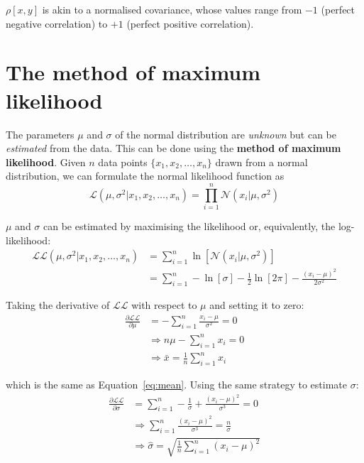 \begin{refsection}
\noindent $\rho[x,y]$ is akin to a normalised covariance, whose values
range from $-1$ (perfect negative correlation) to $+1$ (perfect
positive correlation).

\section{The method of maximum likelihood}
\label{sec:maximum-likelihood}

The parameters $\mu$ and $\sigma$ of the normal distribution are
\emph{unknown} but can be \emph{estimated} from the data. This can be
done using the \textbf{method of maximum likelihood}.  Given $n$ data
points $\{x_1, x_2, \ldots, x_n\}$ drawn from a normal distribution,
we can formulate the normal likelihood function as
\begin{equation}
  \mathcal{L}(\mu,\sigma^2|x_1,x_2,\ldots,x_n) =
  \prod\limits_{i=1}^{n}\mathcal{N}(x_i|\mu,\sigma^2)
  \label{eq:Lnorm}
\end{equation}

$\mu$ and $\sigma$ can be estimated by maximising the likelihood or,
equivalently, the log-likelihood:
\begin{equation}
  \begin{split}
    \mathcal{LL}(\mu,\sigma^2|x_1,x_2,\ldots,x_n) & =
    \sum\limits_{i=1}^{n}\ln\left[\mathcal{N}(x_i|\mu,\sigma^2)\right] \\ & =
    \sum\limits_{i=1}^{n} -\ln[\sigma] - \frac{1}{2}\ln[2\pi] -
    \frac{(x_i-\mu)^2}{2\sigma^2}
  \end{split}
  \label{eq:LLnorm}
\end{equation}

Taking the derivative of $\mathcal{LL}$ with respect to $\mu$ and
setting it to zero:
\begin{equation}
  \begin{split}
    \frac{\partial{\mathcal{LL}}}{\partial{\mu}} & =
    - \sum\limits_{i=1}^{n} \frac{x_i-\mu}{\sigma^2} = 0 \\
    & \Rightarrow n\mu - \sum\limits_{i=1}^{n} x_i = 0 \\
    & \Rightarrow \bar{x} = \frac{1}{n}\sum\limits_{i=1}^{n}x_i
  \end{split}
  \label{eq:arithmeticmean}
\end{equation}

\noindent which is the same as Equation~\ref{eq:mean}. Using the same
strategy to estimate $\sigma$:
\begin{equation}
  \begin{split}
    \frac{\partial{\mathcal{LL}}}{\partial{\sigma}} & =
    \sum\limits_{i=1}^{n} - \frac{1}{\sigma} +  \frac{(x_i-\mu)^2}{\sigma^3} = 0\\
    & \Rightarrow  \sum\limits_{i=1}^{n} \frac{(x_i-\mu)^2}{\sigma^3} =
    \frac{n}{\sigma} \\
    & \Rightarrow \hat{\sigma} = \sqrt{\frac{1}{n}\sum\limits_{i=1}^{n}(x_i-\mu)^2}
  \end{split}
  \label{eq:stdevgivenmu}
\end{equation}


\end{refsection}
